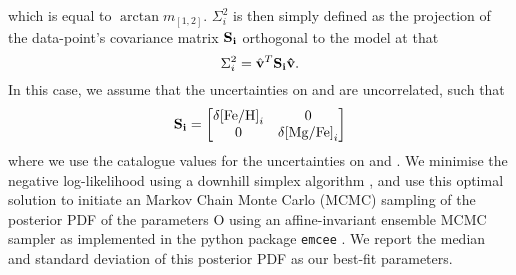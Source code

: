 which is equal to $\arctan{m_{[1,2]}}$. $\Sigma^2_i$ is then simply
defined as the projection of the data-point's covariance matrix
$\bf{S}_i$ orthogonal to the model at that \feh{}
\begin{equation}
\Sigma^2_i = \hat{\bf{v}}^T \bf{S}_i \hat{\bf{v}}.
\end{equation}
In this case, we assume that the uncertainties on \mgfe{} and \feh{}
are uncorrelated, such that
\begin{equation}
\bf{S}_i = \begin{bmatrix} \delta \mathrm{[Fe/H]}_i & 0 \\ 0 & \delta \mathrm{[Mg/Fe]}_i \end{bmatrix}
\end{equation}
where we use the catalogue values for the uncertainties on \feh{}
and \mgfe{}. We minimise the negative log-likelihood using a downhill
simplex algorithm \citep{doi:10.1093/comjnl/7.4.308}, and use this
optimal solution to initiate an Markov Chain Monte Carlo (MCMC)
sampling of the posterior PDF of the parameters O using an
affine-invariant ensemble MCMC sampler \citep{goodmanweare2010} as
implemented in the python package \texttt{emcee}
\citep{2013PASP..125..306F}. We report the median and standard
deviation of this posterior PDF as our best-fit parameters.




